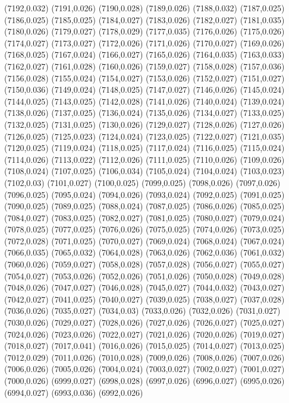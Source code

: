 (7192,0.032)
(7191,0.026)
(7190,0.028)
(7189,0.026)
(7188,0.032)
(7187,0.025)
(7186,0.025)
(7185,0.025)
(7184,0.027)
(7183,0.026)
(7182,0.027)
(7181,0.035)
(7180,0.026)
(7179,0.027)
(7178,0.029)
(7177,0.035)
(7176,0.026)
(7175,0.026)
(7174,0.027)
(7173,0.027)
(7172,0.026)
(7171,0.026)
(7170,0.027)
(7169,0.026)
(7168,0.025)
(7167,0.024)
(7166,0.027)
(7165,0.026)
(7164,0.035)
(7163,0.033)
(7162,0.027)
(7161,0.028)
(7160,0.026)
(7159,0.027)
(7158,0.028)
(7157,0.036)
(7156,0.028)
(7155,0.024)
(7154,0.027)
(7153,0.026)
(7152,0.027)
(7151,0.027)
(7150,0.036)
(7149,0.024)
(7148,0.025)
(7147,0.027)
(7146,0.026)
(7145,0.024)
(7144,0.025)
(7143,0.025)
(7142,0.028)
(7141,0.026)
(7140,0.024)
(7139,0.024)
(7138,0.026)
(7137,0.025)
(7136,0.024)
(7135,0.026)
(7134,0.027)
(7133,0.025)
(7132,0.025)
(7131,0.025)
(7130,0.026)
(7129,0.027)
(7128,0.026)
(7127,0.026)
(7126,0.025)
(7125,0.023)
(7124,0.024)
(7123,0.025)
(7122,0.027)
(7121,0.035)
(7120,0.025)
(7119,0.024)
(7118,0.025)
(7117,0.024)
(7116,0.025)
(7115,0.024)
(7114,0.026)
(7113,0.022)
(7112,0.026)
(7111,0.025)
(7110,0.026)
(7109,0.026)
(7108,0.024)
(7107,0.025)
(7106,0.034)
(7105,0.024)
(7104,0.024)
(7103,0.023)
(7102,0.03)
(7101,0.027)
(7100,0.025)
(7099,0.025)
(7098,0.026)
(7097,0.026)
(7096,0.025)
(7095,0.024)
(7094,0.026)
(7093,0.024)
(7092,0.025)
(7091,0.025)
(7090,0.025)
(7089,0.025)
(7088,0.024)
(7087,0.025)
(7086,0.026)
(7085,0.025)
(7084,0.027)
(7083,0.025)
(7082,0.027)
(7081,0.025)
(7080,0.027)
(7079,0.024)
(7078,0.025)
(7077,0.025)
(7076,0.026)
(7075,0.025)
(7074,0.026)
(7073,0.025)
(7072,0.028)
(7071,0.025)
(7070,0.027)
(7069,0.024)
(7068,0.024)
(7067,0.024)
(7066,0.035)
(7065,0.032)
(7064,0.028)
(7063,0.026)
(7062,0.036)
(7061,0.032)
(7060,0.026)
(7059,0.027)
(7058,0.028)
(7057,0.028)
(7056,0.027)
(7055,0.027)
(7054,0.027)
(7053,0.026)
(7052,0.026)
(7051,0.026)
(7050,0.028)
(7049,0.028)
(7048,0.026)
(7047,0.027)
(7046,0.028)
(7045,0.027)
(7044,0.032)
(7043,0.027)
(7042,0.027)
(7041,0.025)
(7040,0.027)
(7039,0.025)
(7038,0.027)
(7037,0.028)
(7036,0.026)
(7035,0.027)
(7034,0.03)
(7033,0.026)
(7032,0.026)
(7031,0.027)
(7030,0.026)
(7029,0.027)
(7028,0.026)
(7027,0.026)
(7026,0.027)
(7025,0.027)
(7024,0.026)
(7023,0.026)
(7022,0.027)
(7021,0.026)
(7020,0.026)
(7019,0.027)
(7018,0.027)
(7017,0.041)
(7016,0.026)
(7015,0.025)
(7014,0.027)
(7013,0.025)
(7012,0.029)
(7011,0.026)
(7010,0.028)
(7009,0.026)
(7008,0.026)
(7007,0.026)
(7006,0.026)
(7005,0.026)
(7004,0.024)
(7003,0.027)
(7002,0.027)
(7001,0.027)
(7000,0.026)
(6999,0.027)
(6998,0.028)
(6997,0.026)
(6996,0.027)
(6995,0.026)
(6994,0.027)
(6993,0.036)
(6992,0.026)
